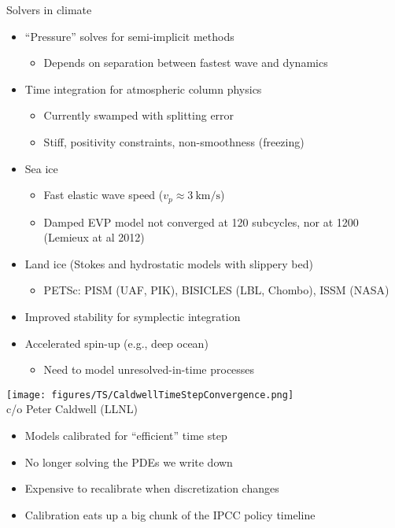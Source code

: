 \documentclass{beamer}
\begin{document}
\begin{frame}{Solvers in climate}
  \begin{itemize}
  \item ``Pressure'' solves for semi-implicit methods
    \begin{itemize}
    \item Depends on separation between fastest wave and dynamics
    \end{itemize}
  \item Time integration for atmospheric column physics
    \begin{itemize}
    \item Currently swamped with splitting error
    \item Stiff, positivity constraints, non-smoothness (freezing)
    \end{itemize}
  \item Sea ice
    \begin{itemize}
    \item Fast elastic wave speed ($v_p \approx \SI{3}{\kilo\metre\per\second}$)
    \item Damped EVP model not converged at 120 subcycles, nor at 1200 (Lemieux at al 2012)
    \end{itemize}
  \item Land ice (Stokes and hydrostatic models with slippery bed)
    \begin{itemize}
    \item PETSc: PISM (UAF, PIK), BISICLES (LBL, Chombo), ISSM (NASA)
    \end{itemize}
  \item Improved stability for symplectic integration
  \item Accelerated spin-up (e.g., deep ocean)
    \begin{itemize}
    \item Need to model unresolved-in-time processes
    \end{itemize}
  \end{itemize}
\end{frame}

\begin{frame}
  \texttt{[image: figures/TS/CaldwellTimeStepConvergence.png]} \\
  c/o Peter Caldwell (LLNL)
  \begin{itemize}
  \item Models calibrated for ``efficient'' time step
  \item No longer solving the PDEs we write down
  \item Expensive to recalibrate when discretization changes
  \item Calibration eats up a big chunk of the IPCC policy timeline
  \end{itemize}
\end{frame}
\end{document}
